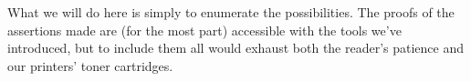What we will do here is simply to enumerate the possibilities. The proofs of the assertions made are (for the most part) accessible with the tools we've introduced, but to include them all would exhaust both the reader's patience and our printers' toner cartridges. 

%
%
%
%
%

